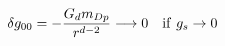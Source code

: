 \begin{equation}
\delta g_{00} = - \frac{G_{d} m_{Dp}}{r^{d-2}} \longrightarrow 0~~~
{\rm if}~g_s \rightarrow 0
\label{g00}
\end{equation}

